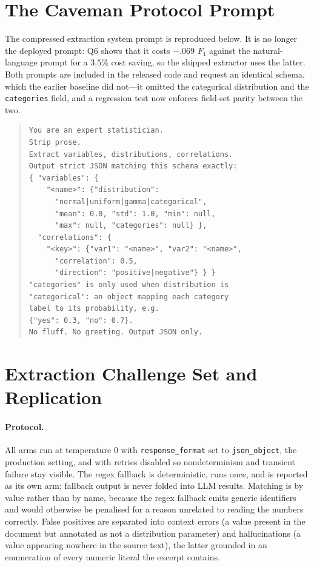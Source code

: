 \documentclass[letterpaper]{article} %
\begin{document}
\section{The Caveman Protocol Prompt}
\label{app:caveman}
The compressed extraction system prompt is reproduced below. It is no longer the
deployed prompt: Q6 shows that it costs $-.069$ $F_1$ against the natural-language
prompt for a $3.5\%$ cost saving, so the shipped extractor uses the latter. Both
prompts are included in the released code and request an identical schema, which
the earlier baseline did not---it omitted the categorical distribution and the
\texttt{categories} field, and a regression test now enforces field-set parity
between the two.

\begin{quote}\begin{scriptsize}\begin{verbatim}
You are an expert statistician.
Strip prose.
Extract variables, distributions, correlations.
Output strict JSON matching this schema exactly:
{ "variables": {
    "<name>": {"distribution":
      "normal|uniform|gamma|categorical",
      "mean": 0.0, "std": 1.0, "min": null,
      "max": null, "categories": null} },
  "correlations": {
    "<key>": {"var1": "<name>", "var2": "<name>",
      "correlation": 0.5,
      "direction": "positive|negative"} } }
"categories" is only used when distribution is
"categorical": an object mapping each category
label to its probability, e.g.
{"yes": 0.3, "no": 0.7}.
No fluff. No greeting. Output JSON only.
\end{verbatim}\end{scriptsize}\end{quote}

\section{Extraction Challenge Set and Replication}
\label{app:extraction}

\paragraph{Protocol.} All arms run at temperature $0$ with
\texttt{response\_format} set to \texttt{json\_object}, the production setting,
and with retries disabled so nondeterminism and transient failure stay visible.
The regex fallback is deterministic, runs once, and is reported as its own arm;
fallback output is never folded into LLM results. Matching is by value rather
than by name, because the regex fallback emits generic identifiers and would
otherwise be penalised for a reason unrelated to reading the numbers correctly.
False positives are separated into context errors (a value present in the
document but annotated as not a distribution parameter) and hallucinations (a
value appearing nowhere in the source text), the latter grounded in an
enumeration of every numeric literal the excerpt contains.
\end{document}
